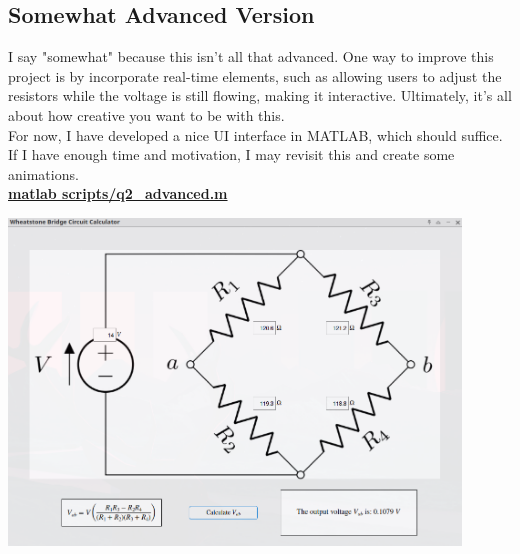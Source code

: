 \documentclass[a4paper, 12pt]{report}
\def\link{blue!50!black}
\begin{document}
    
    \newpage
    \subsection{Somewhat Advanced Version}
    I say "somewhat" because this isn't all that advanced. One way to improve this project is by incorporate real-time elements, such as allowing users to adjust the resistors while the voltage is still flowing, making it interactive. Ultimately, it’s all about how creative you want to be with this.\\[1em]
    For now, I have developed a nice UI interface in MATLAB, which should suffice. If I have enough time and motivation, I may revisit this and create some animations.\\
    \vspace{1em}
    \href{https://github.com/sakx7/mathcompuni/blob/main/matlab scripts/q2_advanced.m}{\textcolor{\link}{\textbf{matlab scripts/q2\_advanced.m}}}\\[1em]
    
    \begin{center}
        \includegraphics[width=0.9\textwidth]{images/q2a.png}
    \end{center}
\end{document}
